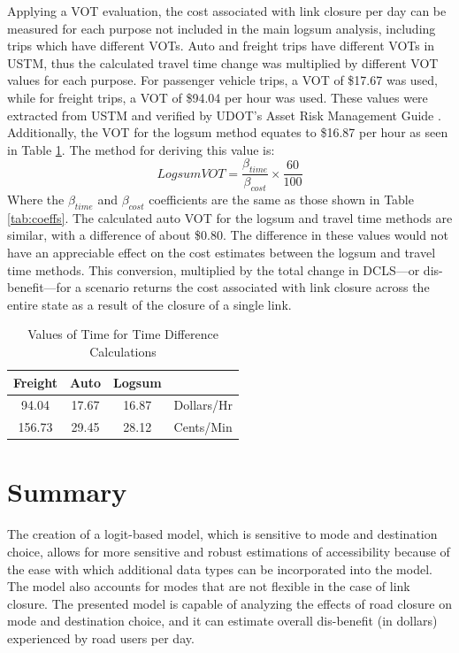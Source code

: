 Applying a VOT evaluation, the cost associated with link
closure per day can be measured for each purpose not included in
the main logsum analysis, including trips which have different VOTs. Auto and freight trips have different
VOTs in USTM, thus the calculated travel time change was
multiplied by different VOT values for each purpose. For passenger vehicle
trips, a VOT of \$17.67 was used, while for freight trips, a VOT of
\$94.04 per hour was used. These values were extracted from USTM and
verified by UDOT's Asset Risk Management Guide \citep{UtahDepartmentofTransportation2020}.
Additionally, the VOT for the logsum method equates to \$16.87 per hour as seen in
Table \ref{tab:VOT}. The method for deriving this value is:
\begin{equation}
  Logsum VOT = \frac{\beta_{time}}{\beta_{cost}} \times \frac{60}{100}
  \label{eqn:cost}
\end{equation}
Where the $\beta_{time}$ and $\beta_{cost}$ coefficients are the same as those
shown in Table \ref{tab:coeffs}. The calculated auto VOT for the logsum and
travel time methods are similar, with a difference
of about \$0.80. The difference in these values would not have an appreciable effect
on the cost estimates between the logsum and travel time methods. This conversion,
multiplied by the total change in DCLS---or dis-benefit---for a scenario returns the cost
associated with link closure across the entire state as a result of the closure of a single link.

\begin{table}
\caption{\label{tab:VOT}Values of Time for Time Difference Calculations}
\centering
\begin{tabular}[t]{cccl}
\toprule
Freight & Auto & Logsum\\
\midrule
94.04 & 17.67 & 16.87 & Dollars/Hr\\
156.73 & 29.45 & 28.12 & Cents/Min\\
\bottomrule
\end{tabular}
\end{table}

\section{Summary}

The creation of a logit-based model, which is sensitive to mode and destination
choice, allows for more sensitive and robust estimations of accessibility because
of the ease with which additional data types can be incorporated into the model. The
model also accounts for modes that are not flexible in the case of link
closure. The presented model is capable of analyzing the effects of
road closure on mode and destination choice, and it can estimate overall
dis-benefit (in dollars) experienced by road users per day.
